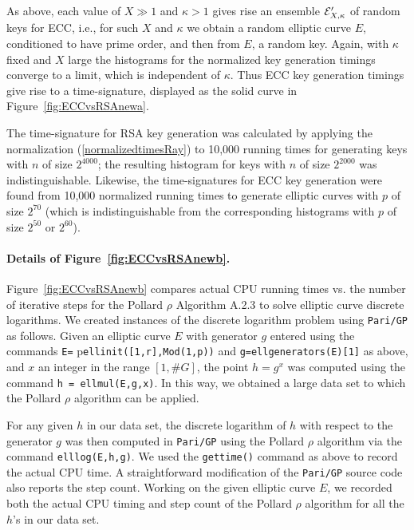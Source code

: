 \documentclass{llncs}
\numberwithin{equation}{section}
\renewcommand\({\left(}
\renewcommand\){\right)}
\begin{document}
 As above, each value of $X\gg 1 $ and $\kappa >1$ gives rise an ensemble ${\cal E}'_{X,\kappa}$ of random keys for ECC, i.e., for such $X$ and $\kappa$ we obtain a random elliptic curve $E$, conditioned to have prime order, and then from  $E$, a random key.  Again, with $\kappa$ fixed and $X$ large the histograms for the normalized key generation timings  converge  to a limit, which is independent of $\kappa$.  Thus ECC key generation timings give rise to a time-signature, displayed as the solid curve in  Figure~\ref{fig:ECCvsRSAnewa}.




The time-signature for RSA key generation was calculated by applying the normalization (\ref{normalizedtimesRay}) to 10,000 running times for generating keys with $n$ of size  $2^{4000}$; the resulting histogram for keys with $n$ of size  $2^{2000}$ was indistinguishable.  Likewise, the time-signatures for ECC key generation  were found from 10,000 normalized  running times to generate elliptic curves with $p$ of size $2^{70}$ (which is indistinguishable from the corresponding histograms   with $p$ of size $2^{50}$ or $2^{60}$).


\paragraph{\bf Details of Figure~\ref{fig:ECCvsRSAnewb}.}  Figure~\ref{fig:ECCvsRSAnewb} compares actual CPU running times vs. the number of iterative steps for the Pollard $\rho$ Algorithm A.2.3 to solve elliptic curve discrete logarithms.  We created instances of the discrete logarithm problem using {\tt Pari/GP} as follows. Given an elliptic curve  $E$ with generator $g$ entered using the commands {\tt E=} p{\tt ellinit([1,r],Mod(1,p))} and {\tt g=ellgenerators(E)[1]} as above,
and $x$ an integer in the range $[1,\#G]$,
the point $h=g^x$ was computed using the command {\tt h = ellmul(E,g,x)}.  In this way, we obtained a large data set to which the Pollard $\rho$ algorithm can be applied.

 For any given $h$ in our data set, the discrete logarithm of $h$ with respect to the generator $g$ was then computed  in {\tt Pari/GP} using the Pollard $\rho$ algorithm via the command {\tt elllog(E,h,g)}.  We used the {\tt gettime()} command as above to record the actual CPU time.  A straightforward   modification of the {\tt Pari/GP} source code also reports the step count.
  Working on the given elliptic curve $E$, we recorded both the actual CPU timing and step count of the Pollard $\rho$ algorithm for all the $h$'s in our data set.
\end{document}

